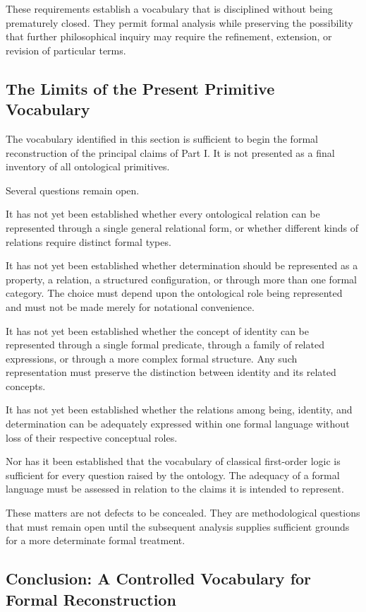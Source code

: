 These requirements establish a vocabulary
that is disciplined without being prematurely
closed. They permit formal analysis while
preserving the possibility that further
philosophical inquiry may require the
refinement, extension, or revision of
particular terms.

\subsection{The Limits of the Present Primitive Vocabulary}

The vocabulary identified in this section
is sufficient to begin the formal reconstruction
of the principal claims of Part I. It is
not presented as a final inventory of all
ontological primitives.

Several questions remain open.

It has not yet been established whether
every ontological relation can be represented
through a single general relational form,
or whether different kinds of relations
require distinct formal types.

It has not yet been established whether
determination should be represented as a
property, a relation, a structured configuration,
or through more than one formal category.
The choice must depend upon the ontological
role being represented and must not be made
merely for notational convenience.

It has not yet been established whether
the concept of identity can be represented
through a single formal predicate, through
a family of related expressions, or through
a more complex formal structure. Any such
representation must preserve the distinction
between identity and its related concepts.

It has not yet been established whether
the relations among being, identity, and
determination can be adequately expressed
within one formal language without loss
of their respective conceptual roles.

Nor has it been established that the
vocabulary of classical first-order logic
is sufficient for every question raised
by the ontology. The adequacy of a formal
language must be assessed in relation to
the claims it is intended to represent.

These matters are not defects to be concealed.
They are methodological questions that
must remain open until the subsequent
analysis supplies sufficient grounds for
a more determinate formal treatment.

\subsection{Conclusion: A Controlled Vocabulary for Formal Reconstruction}

